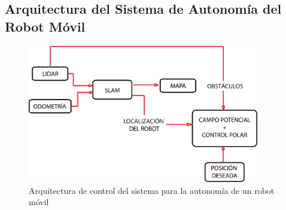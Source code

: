 


\subsection{Arquitectura del Sistema de Autonomía del Robot Móvil}

\begin{figure}%
	\centering \footnotesize
	\includegraphics[width=0.9\textwidth]{images/estruct_auto.png}
	\captionsetup{font=footnotesize}
	\caption{Arquitectura de control del sistema para la autonomía de un robot móvil}
	\label{fig:ArqSist}
\end{figure}
 
